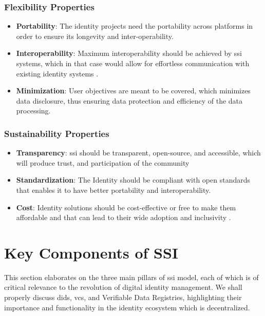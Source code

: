 \subsubsection{Flexibility Properties}

\begin{itemize}
    \item \textbf{Portability}: The identity projects need the portability across platforms in order to ensure its longevity and inter-operability.
    \item \textbf{Interoperability}: Maximum interoperability should be achieved by \gls{ssi} systems, which in that case would allow for effortless communication with 
    existing identity systems \cite{9869618}. 
    \item \textbf{Minimization}: User objectives are meant to be covered, which minimizes data disclosure, thus ensuring data protection and efficiency of the data processing.
\end{itemize}

\subsubsection{Sustainability Properties}

\begin{itemize}
    \item \textbf{Transparency}: \gls{ssi} should be transparent, open-source, and accessible, which will produce trust, and participation of the community
    \item \textbf{Standardization}: The Identity should be compliant with open standards that enables it to have better portability and interoperability.
    \item \textbf{Cost}: Identity solutions should be cost-effective or free to make them affordable and that can lead to their wide adoption and inclusivity \cite{9869618}.
\end{itemize}

\section{Key Components of SSI}

This section elaborates on the three main pillars of \gls{ssi} model, each of which is of critical relevance to the revolution of digital identity management. We shall properly 
discuss \gls{did}s, \gls{vc}s, and Verifiable Data Registries, highlighting their importance and functionality in the identity 
ecosystem which is decentralized.

